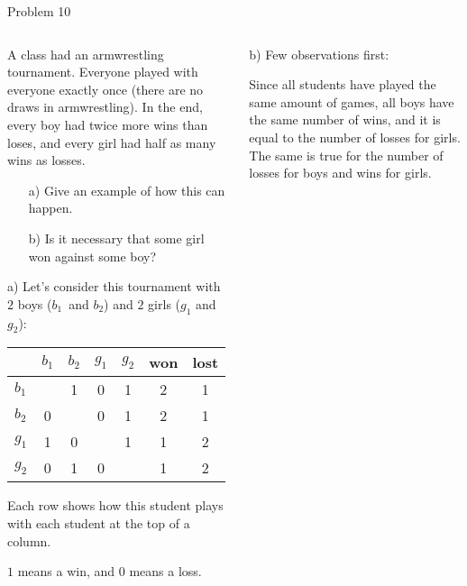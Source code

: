 \documentclass[9pt,aspectratio=169]{beamer}
\begin{document}
\begin{frame}{Problem 10}
  \begin{columns}[T]
    \begin{column}{0.5\textwidth}
      \begin{problem}
        A class had an armwrestling tournament. Everyone played with everyone exactly once (there are no draws in armwrestling). In the end, every boy had twice more wins than loses, and every girl had half as many wins as losses.
        \vspace*{-0.7ex}
        \begin{enumerate}
          \setlength{\itemsep}{0pt}
          \item[a)] Give an example of how this can happen.

          \item[b)] Is it necessary that some girl won against some boy?
        \end{enumerate}
        \vspace*{-0.7ex}
      \end{problem}
      a) Let's consider this tournament with $2$ boys ($b_1$~and $b_2$) and $2$ girls ($g_1$ and $g_2$):
      \begin{center}
        \vspace*{-0.5ex}
        \begin{tabular}{|l||c|c|c|c||c|c|}
          \hline 
          & $b_1$ & $b_2$ & $g_1$ & $g_2$ & won & lost \\\hline\hline
          $b_1$\vphantom{$b_1^1$} &  & 1 & 0 & 1 & 2 & 1 \\\hline 
          $b_2$\vphantom{$b_1^1$} & 0 &  & 0 & 1 & 2 & 1 \\\hline 
          $g_1$\vphantom{$b_1^1$} & 1 & 0 &  & 1 & 1 & 2 \\\hline 
          $g_2$\vphantom{$b_1^1$} & 0 & 1 & 0 &  & 1 & 2 \\\hline
        \end{tabular}
        \vspace*{-0.5ex}
      \end{center}
      Each row shows how this student plays with each student at the top of a column. 
      
      $1$ means a win, and $0$ means a loss.

    \end{column}
    \begin{column}{0.5\textwidth}
      \small
      b) Few observations first:

      Since all students have played the same amount of games, all boys have the same number of wins, and it is equal to the number of losses for girls. The same is true for the number of losses for boys and wins for girls.
      \smallskip
      

\end{column}
\end{columns}
\end{frame}
\end{document}
